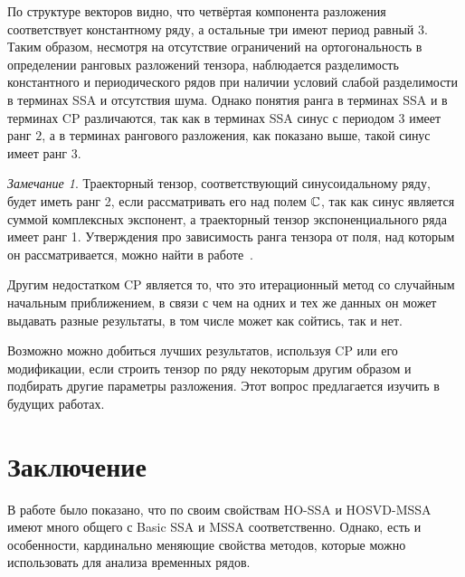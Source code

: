 \documentclass[specialist,
    substylefile=spbu.rtx,
    subf,href,colorlinks=true, 12pt]{disser}
\theoremstyle{plain}
\theoremstyle{definition}
\theoremstyle{remark}
\newtheorem*{remark}{Замечание}
\begin{document}
    По структуре векторов видно, что четвёртая компонента разложения соответствует константному ряду, а остальные три имеют период равный $3$.
    Таким образом, несмотря на отсутствие ограничений на ортогональность в определении ранговых разложений тензора, наблюдается
    разделимость константного и периодического рядов при наличии условий слабой разделимости в терминах SSA и отсутствия
    шума.
    Однако понятия ранга в терминах SSA и в терминах CP различаются, так как в терминах SSA синус с периодом $3$ имеет ранг $2$, а в
    терминах рангового разложения, как показано выше, такой синус имеет ранг $3$.
    \begin{remark}
        Траекторный тензор, соответствующий синусоидальному ряду, будет иметь ранг 2, если рассматривать его
        над полем $\mathbb{C}$, так как синус является суммой комплексных экспонент, а траекторный тензор экспоненциального
        ряда имеет ранг 1.
        Утверждения про зависимость ранга тензора от поля, над которым он рассматривается, можно найти в
        работе~\cite{tensor-bg}.
    \end{remark}

    Другим недостатком CP является то, что это итерационный метод со случайным начальным приближением, в связи
    с чем на одних и тех же данных он может выдавать разные результаты, в том числе может как сойтись, так и нет.

    Возможно можно добиться лучших результатов, используя CP или его модификации, если строить тензор по ряду
    некоторым другим образом и подбирать другие параметры разложения.
    Этот вопрос предлагается изучить в будущих работах.
    \newpage


    \section{Заключение}\label{sec:conclusion}
    В работе было показано, что по своим свойствам HO-SSA и HOSVD-MSSA имеют много общего
    с Basic SSA и MSSA соответственно.
    Однако, есть и особенности, кардинально меняющие свойства методов, которые можно использовать для анализа временных рядов.
\end{document}
